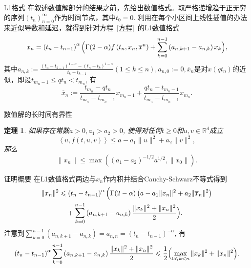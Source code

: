 \documentclass[aspectratio=16 9, 10pt, notheorems]{ctexbeamer}
\let\oldeqref\eqref
\renewcommand{\eqref}[1]{~\oldeqref{#1}~}
\newcommand{\mainEquation}{方程\eqref{方程}}
\newcommand{\relphantom}[1]{\mathrel{\phantom{#1}}\negmedspace {}}
\newcommand{\realset}{\mathbb{R}}
\newtheorem{theorem}{定理}
\begin{document}
\begin{frame}{L1格式}
    在叙述数值解部分的结果之前，先给出数值格式。取严格递增趋于正无穷的序列$\left(t_n\right)_{n=0}^\infty$作为时间节点，其中$t_0=0$. 利用在每个小区间上线性插值的办法来近似导数和延迟，就得到针对\mainEquation 的L1数值格式
    \begin{equation*}\label{L1格式}
        x_n=\left(t_n-t_{n-1}\right)^\alpha \Bigl(\Gamma(2-\alpha) f\left(t_n,x_n,\overline{x}^n\right) + \sum_{k=0}^{n-1} \left(a_{n,k+1}-a_{n,k}\right) x_k\Bigr),
    \end{equation*}
    其中$a_{n,k}:=\frac{\left(t_n-t_{k-1}\right)^{1-\alpha}-\left(t_n-t_{k}\right)^{1-\alpha}}{t_k-t_{k-1}} (1\leqslant k\leqslant n),a_{n,0}:=0,\overline x_n$是对$x(qt_n)$的近似，即设$t_{m_n-1}\leqslant qt_n<t_{m_n}$, 有
    \begin{equation*}
        \overline x_n:=\frac{t_{m_n}-qt_n}{t_{m_n}-t_{m_n-1}}x_{m_n-1}+\frac{qt_n-t_{m_n-1}}{t_{m_n}-t_{m_n-1}}x_{m_n}.
    \end{equation*}
\end{frame}
\begin{frame}{数值解的长时间有界性}
    \begin{theorem}\label{dissipativity}
        如果存在常数$a>0,a_1>a_2>0$, 使得对任何$t\geqslant 0$和$u,v\in \realset^d$成立
        \begin{equation*}
            \left<u,f(t,u,v)\right>\leqslant a-a_1 \|u\|^2+a_2 \|v\|^2,
        \end{equation*}
        那么
        \begin{equation*}\label{耗散性结果}
            \|x_n\|\leqslant \max\left(\left(a_1-a_2\right)^{-1/2}a^{1/2},\|x_0\|\right).
        \end{equation*}
    \end{theorem}
\end{frame}
\begin{frame}{证明概要}
    在L1数值格式两边与$x_n$作内积并结合Cauchy-Schwarz不等式得到
    \begin{equation}\label{耗散性-内积放缩}
        \begin{aligned}
            \|x_n\|^2&\leqslant \left(t_n-t_{n-1}\right)^\alpha \Bigl( \Gamma(2-\alpha) \left(a-a_1 \|x_n\|^2 + a_2 \|\overline x_n\|^2\right)
            \\ &\relphantom{\leqslant} + \sum_{k=0}^{n-1} \left(a_{n,k+1}-a_{n,k}\right) \frac{\|x_k\|^2+\|x_n\|^2}{2}\Bigr).
        \end{aligned}
    \end{equation}
    注意到$\sum_{k=0}^{n-1} \left(a_{n,k+1}-a_{n,k}\right)=a_{n,n}=\left(t_n-t_{n-1}\right)^{-\alpha}$, 有
    \begin{equation}\label{耗散性-求和}
        \left(t_n-t_{n-1}\right)^\alpha \sum_{k=0}^{n-1} \left(a_{n,k+1}-a_{n,k}\right) \frac{\|x_k\|^2+\|x_n\|^2}{2}\leqslant\frac{1}{2}\Bigl(\max_{0\leqslant k<n} \|x_k\|^2 + \|x_n\|^2\Bigr).
    \end{equation}
\end{frame}
\end{document}
